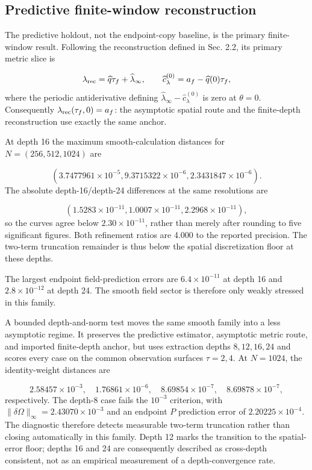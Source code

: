 \documentclass{iopjournal}
\begin{document}
\subsection{Predictive finite-window reconstruction}
The predictive holdout, not the endpoint-copy baseline, is the primary finite-window result. Following the reconstruction defined in Sec. 2.2, its primary metric slice is

\[
\lambda_{\rm rec}=\widehat q\tau_f+\widehat\lambda_\infty,
\qquad
\widehat c_\lambda^{(0)}=a_f-\widehat q(0)\tau_f,
\]
where the periodic antiderivative defining $\widehat\lambda_\infty-\widehat c_\lambda^{(0)}$ is zero at $\theta=0$. Consequently $\lambda_{\rm rec}(\tau_f,0)=a_f$: the asymptotic spatial route and the finite-depth reconstruction use exactly the same anchor.

At depth 16 the maximum smooth-calculation distances for $N=(256,512,1024)$ are

\[
(3.7477961\times10^{-5},
9.3715322\times10^{-6},
2.3431847\times10^{-6}).
\]
The absolute depth-16/depth-24 differences at the same resolutions are

\[
(1.5283\times10^{-11},
1.0007\times10^{-11},
2.2968\times10^{-11}),
\]
so the curves agree below $2.30\times10^{-11}$, rather than merely after rounding to five significant figures. Both refinement ratios are 4.000 to the reported precision. The two-term truncation remainder is thus below the spatial discretization floor at these depths.

The largest endpoint field-prediction errors are $6.4\times10^{-11}$ at depth 16 and $2.8\times10^{-12}$ at depth 24. The smooth field sector is therefore only weakly stressed in this family.

A bounded depth-and-norm test moves the same smooth family into a less asymptotic regime. It preserves the predictive estimator, asymptotic metric route, and imported finite-depth anchor, but uses extraction depths $8,12,16,24$ and scores every case on the common observation surfaces $\tau=2,4$. At $N=1024$, the identity-weight distances are

\[
2.58457\times10^{-3},\quad
1.76861\times10^{-6},\quad
8.69854\times10^{-7},\quad
8.69878\times10^{-7},
\]
respectively. The depth-8 case fails the $10^{-3}$ criterion, with $\|\delta\Omega\|_\infty=2.43070\times10^{-3}$ and an endpoint $P$ prediction error of $2.20225\times10^{-4}$. The diagnostic therefore detects measurable two-term truncation rather than closing automatically in this family. Depth 12 marks the transition to the spatial-error floor; depths 16 and 24 are consequently described as cross-depth consistent, not as an empirical measurement of a depth-convergence rate.
\end{document}
